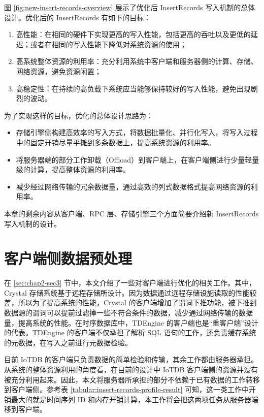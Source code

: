 图 \ref{fig:new-insert-records-overview} 展示了优化后 InsertRecords 写入机制的总体设计。优化后的 InsertRecords 有如下的目标：
\begin{enumerate}
  \item 高性能：在相同的硬件下实现更高的写入性能，包括更高的吞吐以及更低的延迟；或者在相同的写入性能下降低对系统资源的使用；
  \item 高系统整体资源的利用率：充分利用系统中客户端和服务器侧的计算、存储、网络资源，避免资源闲置；
  \item 高稳定性：在持续的高负载下系统应当能够保持较好的写入性能，避免出现剧烈的波动。
\end{enumerate}
为了实现这样的目标，优化的总体设计思路为：
\begin{itemize}
  \item 存储引擎侧构建高效率的写入方式，将数据批量化、并行化写入，将写入过程中的固定开销尽量平摊到多条数据上，提高系统资源的利用率。
  \item 将服务器端的部分工作卸载（Offload）到客户端上，在客户端侧进行少量轻量级的计算，提高整体资源的利用率。
  \item 减少经过网络传输的冗余数据量，通过高效的列式数据格式提高网络资源的利用率。
\end{itemize}
本章的剩余内容从客户端、RPC 层、存储引擎三个方面简要介绍新 InsertRecords 写入机制的设计。

\section{客户端侧数据预处理}
在 \ref{sec:chap2-sec3} 节中，本文介绍了一些对客户端进行优化的相关工作。其中， Crystal 存储系统基于远程存储所设计\cite{durner2021crystal}。因为数据通过远程存储设施读取的性能较差，所以为了提高系统的性能，Crystal 的客户端增加了谓词下推功能，被下推到数据源的谓词可以提前过滤掉一些不符合条件的数据，减少通过网络传输的数据量，提高系统的性能。在时序数据库中，TDEngine 的客户端也是“重客户端”设计的代表。TDEngine 的客户端不仅承担了解析 SQL 语句的工作，还负责缓存系统的元数据，在写入之前进行元数据检验。

目前 IoTDB 的客户端只负责数据的简单检验和传输，其余工作都由服务器承担。从系统的整体资源利用的角度看，在目前的设计中 IoTDB 客户端侧的资源并没有被充分利用起来。因此，本文将服务器所承担的部分不依赖于已有数据的工作转移到客户端侧。参考表 \ref{tabular:insert-records-profile-result} 可知，这一类工作中开销最大的就是时间序列 ID 和内存开销计算，本工作将会把这两项任务从服务器端移到客户端。

